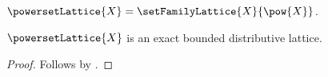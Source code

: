 \begin{definition}\label{powerset_lattice}
    $\powersetLattice{X}=\setFamilyLattice{X}{\pow{X}}$.
\end{definition}

\begin{theorem}\label{powerset_lattice_is_exact_bounded_distributive_lattice}
    $\powersetLattice{X}$ is an exact bounded distributive lattice.
\end{theorem}
\begin{proof}
    Follows by
        .
\end{proof}
